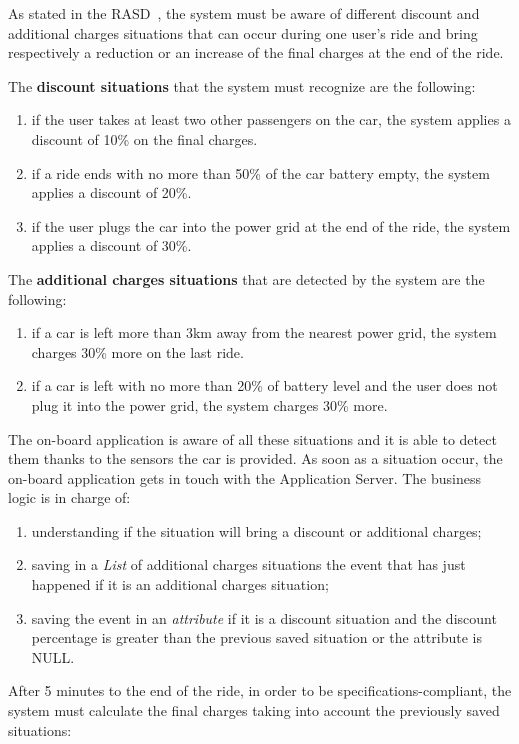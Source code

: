 As stated in the RASD~\cite{rasd}, the system must be aware of different discount and additional charges situations that can occur during one user's ride and bring respectively a reduction or an increase of the final charges at the end of the ride.

The \textbf{discount situations} that the system must recognize are the following:
\begin{enumerate}
\item if the user takes at least two other passengers on the car, the system applies a discount of 10\% on the final charges.
\item if a ride ends with no more than 50\% of the car battery empty, the system applies a discount of 20\%.
\item if the user plugs the car into the power grid at the end of the ride, the system applies a discount of 30\%.
\end{enumerate}
\noindent
The \textbf{additional charges situations} that are detected by the system are the following:
\begin{enumerate}
\item if a car is left more than 3km away from the nearest power grid, the system charges 30\% more on the last ride.
\item if a car is left with no more than 20\% of battery level and the user does not plug it into the power grid, the system charges 30\% more.
\end{enumerate}
\noindent
The on-board application is aware of all these situations and it is able to detect them thanks to the sensors the car is provided.
As soon as a situation occur, the on-board application gets in touch with the Application Server. The business logic is in charge of:
\begin{enumerate}
\item understanding if the situation will bring a discount or additional charges;
\item saving in a \emph{List} of additional charges situations the event that has just happened if it is an additional charges situation;
\item saving the event in an \emph{attribute} if it is a discount situation and the discount percentage is greater than the previous saved situation or the attribute is NULL.
\end{enumerate}
\noindent
After 5 minutes to the end of the ride, in order to be specifications-compliant, the system must calculate the final charges taking into account the previously saved situations:
